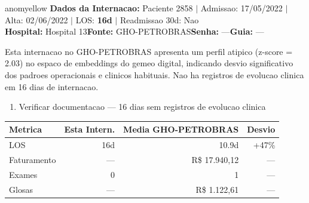 \documentclass[a4paper,10pt]{article}
\begin{document}
\begin{anomalycard}[Internacao 2397 | GHO-PETROBRAS | MODERADO (z=2.03)]{anomyellow}
\textbf{Dados da Internacao:} Paciente 2858 $\mid$ Admissao: 17/05/2022 $\mid$ Alta: 02/06/2022 $\mid$ LOS: \textbf{16d} $\mid$ Readmissao 30d: Nao\\
\textbf{Hospital:} Hospital 13\quad\textbf{Fonte:} GHO-PETROBRAS\quad\textbf{Senha:} ---\quad\textbf{Guia:} ---\\
\vspace{2pt}\begin{tcolorbox}[colback=severityred!20,colframe=anomyellow,title={\textbf{Interpretacao de Negocio}},fonttitle=\bfseries\small,left=4pt,right=4pt,top=3pt,bottom=3pt]
{\small Esta internacao no GHO-PETROBRAS apresenta um perfil atipico (z-score = 2.03) no espaco de embeddings do gemeo digital, indicando desvio significativo dos padroes operacionais e clinicos habituais. Nao ha registros de evolucao clinica em 16 dias de internacao.}
\end{tcolorbox}
\begin{tcolorbox}[colback=severityyellow!30,colframe=anomorange,title={\textbf{Recomendacoes Especificas}},fonttitle=\bfseries\small,left=4pt,right=4pt,top=3pt,bottom=3pt]
\begin{enumerate}[nosep,leftmargin=16pt]
\item {\small Verificar documentacao --- 16 dias sem registros de evolucao clinica}
\end{enumerate}
\end{tcolorbox}
\begin{center}\begin{tabular}{l r r r}\toprule\textbf{Metrica} & \textbf{Esta Intern.} & \textbf{Media GHO-PETROBRAS} & \textbf{Desvio} \\\midrule
LOS & 16d & 10.9d & +47\% \\
Faturamento & --- & R\$ 17.940,12 & --- \\
Exames & 0 & 1 & --- \\
Glosas & --- & R\$ 1.122,61 & --- \\
\bottomrule\end{tabular}\end{center}


\end{anomalycard}
\end{document}
